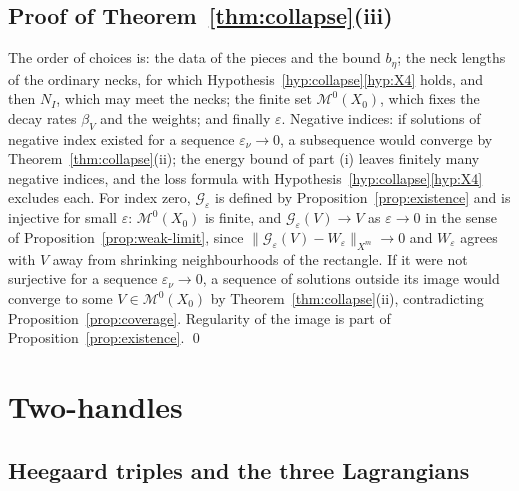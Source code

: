 \documentclass[11pt]{amsart}
\theoremstyle{definition}
\theoremstyle{remark}
\theoremstyle{plain}
\numberwithin{equation}{section}
\newcommand{\cG}{\mathcal{G}}
\newcommand{\cM}{\mathcal{M}}
\newcommand{\eps}{\varepsilon}
\begin{document}
\subsection{Proof of Theorem~\ref{thm:collapse}(iii)}

The order of choices is: the data of the pieces and the bound $b_\eta$; the neck
lengths of the ordinary necks, for which
Hypothesis~\ref{hyp:collapse}\ref{hyp:X4} holds, and then $N_I$, which may meet the necks; the finite set
$\cM^0(X_0)$, which fixes the decay rates $\beta_V$ and the weights; and
finally $\eps$. Negative indices: if solutions of negative index existed
for a sequence $\eps_\nu\to0$, a subsequence would converge by
Theorem~\ref{thm:collapse}(ii); the energy bound of part (i) leaves
finitely many negative indices, and the loss formula with
Hypothesis~\ref{hyp:collapse}\ref{hyp:X4} excludes each. For index zero,
$\cG_\eps$ is defined by Proposition~\ref{prop:existence} and is injective for
small $\eps$: $\cM^0(X_0)$ is finite, and $\cG_\eps(V)\to V$ as $\eps\to0$ in the
sense of Proposition~\ref{prop:weak-limit}, since
$\|\cG_\eps(V)-W_\eps\|_{X^m}\to0$ and $W_\eps$ agrees with $V$ away from
shrinking neighbourhoods of the rectangle. If it were not surjective for
a sequence $\eps_\nu\to0$, a sequence of solutions outside its image would
converge to some $V\in\cM^0(X_0)$ by Theorem~\ref{thm:collapse}(ii),
contradicting Proposition~\ref{prop:coverage}. Regularity of the image is
part of Proposition~\ref{prop:existence}. \qed

\section{Two-handles}\label{sec:two-handles}

\subsection{Heegaard triples and the three Lagrangians}\label{subsec:triple-data}
\end{document}
